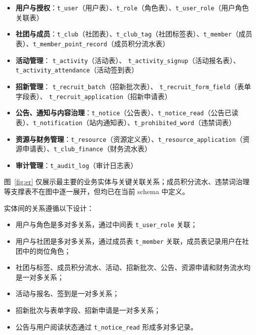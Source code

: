 \begin{itemize}
  \item \textbf{用户与授权}：\texttt{t\_user}（用户表）、\texttt{t\_role}（角色表）、\texttt{t\_user\_role}（用户角色关联表）
  \item \textbf{社团与成员}：\texttt{t\_club}（社团表）、\texttt{t\_club\_tag}（社团标签表）、\texttt{t\_member}（成员表）、\texttt{t\_member\_point\_record}（成员积分流水表）
  \item \textbf{活动管理}：
        \texttt{t\_activity}（活动表）、\allowbreak
        \texttt{t\_}\allowbreak\texttt{activity\_}\allowbreak\texttt{signup}（活动报名表）、\allowbreak
        \texttt{t\_}\allowbreak\texttt{activity\_}\allowbreak\texttt{attendance}（活动签到表）
  \item \textbf{招新管理}：
        \texttt{t\_}\allowbreak\texttt{recruit\_}\allowbreak\texttt{batch}（招新批次表）、\allowbreak
        \texttt{t\_}\allowbreak\texttt{recruit\_}\allowbreak\texttt{form\_}\allowbreak\texttt{field}（表单字段表）、\allowbreak
        \texttt{t\_}\allowbreak\texttt{recruit\_}\allowbreak\texttt{application}（招新申请表）
  \item \textbf{公告、通知与内容治理}：\texttt{t\_notice}（公告表）、\texttt{t\_notice\_read}（公告已读表）、\texttt{t\_notification}（站内通知表）、\texttt{t\_prohibited\_word}（违禁词表）
  \item \textbf{资源与财务管理}：\texttt{t\_resource}（资源定义表）、\texttt{t\_resource\_application}（资源申请表）、\texttt{t\_club\_finance}（财务流水表）
  \item \textbf{审计管理}：\texttt{t\_audit\_log}（审计日志表）
\end{itemize}

图~\ref{fig:er} 仅展示最主要的业务实体与关键关联关系；成员积分流水、违禁词治理等支撑表不在图中逐一展开，但均已在当前 schema 中定义。

实体间的关系遵循以下设计：

\begin{itemize}
  \item 用户与角色是多对多关系，通过中间表 \texttt{t\_user\_role} 关联；
  \item 用户与社团是多对多关系，通过成员表 \texttt{t\_member} 关联，成员表记录用户在社团中的岗位角色；
  \item 社团与标签、成员积分流水、活动、招新批次、公告、资源申请和财务流水均是一对多关系；
  \item 活动与报名、签到是一对多关系；
  \item 招新批次与表单字段、招新申请是一对多关系；
  \item 公告与用户阅读状态通过 \texttt{t\_notice\_read} 形成多对多记录。
\end{itemize}

